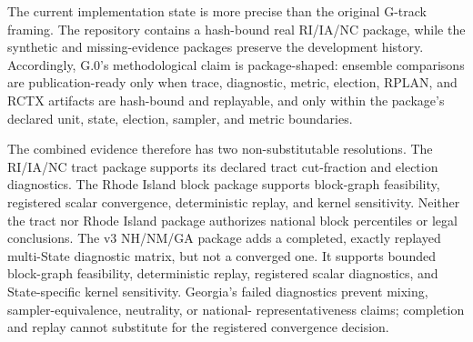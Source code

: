 The current implementation state is more precise than the original G-track
framing. The repository contains a hash-bound real RI/IA/NC package, while the
synthetic and missing-evidence packages preserve the development history.
Accordingly, G.0's methodological claim is package-shaped: ensemble
comparisons are publication-ready only when trace, diagnostic, metric,
election, RPLAN, and RCTX artifacts are hash-bound and replayable, and only
within the package's declared unit, state, election, sampler, and metric
boundaries.

The combined evidence therefore has two non-substitutable resolutions.  The
RI/IA/NC tract package supports its declared tract cut-fraction and election
diagnostics.  The Rhode Island block package supports block-graph feasibility,
registered scalar convergence, deterministic replay, and kernel sensitivity.
Neither the tract nor Rhode Island package authorizes national block
percentiles or legal conclusions.  The v3 NH/NM/GA package adds a completed,
exactly replayed multi-State diagnostic matrix, but not a converged one.  It
supports bounded block-graph feasibility, deterministic replay, registered
scalar diagnostics, and State-specific kernel sensitivity.  Georgia's failed
diagnostics prevent mixing, sampler-equivalence, neutrality, or national-
representativeness claims; completion and replay cannot substitute for the
registered convergence decision.
